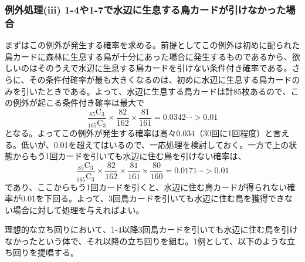 \begin{multicols}{2}
\subsubsection{例外処理(i\hspace{-1.2pt}i\hspace{-1.2pt}i) 1-4や1-7で水辺に生息する鳥カードが引けなかった場合}
まずはこの例外が発生する確率を求める。前提としてこの例外は初めに配られた鳥カードに森林に生息する鳥が十分にあった場合に発生するものであるから、欲しいのはそのうえで水辺に生息する鳥カードを引けない条件付き確率である。さらに、その条件付確率が最も大きくなるのは、初めに水辺に生息する鳥カードのみを引いたときである。よって、水辺に生息する鳥カードは計85枚あるので、この例外が起こる条件付き確率は最大で
\begin{equation*}
  \frac{{}_{85} \mathrm{C}_3}{{}_{165} \mathrm{C}_3}\times\frac{82}{162}\times\frac{81}{161}=0.0342\cdots>0.01
\end{equation*}
となる。よってこの例外が発生する確率は高々0.034（30回に1回程度）と言える。低いが、0.01を超えてはいるので、一応処理を検討しておく。一方で上の状態からもう1回カードを引いても水辺に住む鳥を引けない確率は、
\begin{equation*}
  \frac{{}_{85} \mathrm{C}_3}{{}_{165} \mathrm{C}_3}\times\frac{82}{162}\times\frac{81}{161}\times\frac{80}{160}=0.0171\cdots>0.01
\end{equation*}
であり、ここからもう1回カードを引くと、水辺に住む鳥カードが得られない確率が0.01を下回る。よって、3回鳥カードを引いても水辺に住む鳥を獲得できない場合に対して処理を与えればよい。
\par
理想的な立ち回りにおいて、1-4以降3回鳥カードを引いても水辺に住む鳥を引けなかったという体で、それ以降の立ち回りを組む。1例として、以下のような立ち回りを提唱する。


\end{multicols}
